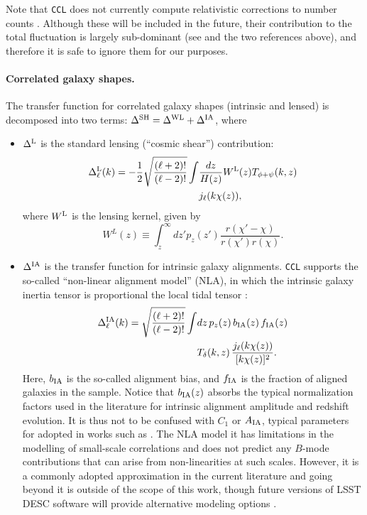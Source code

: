 \documentclass[\docopts]{\docclass}
\newcommand{\ccl}{{\tt CCL}\xspace}
\begin{document}
Note that \ccl does not currently compute relativistic corrections to number counts \citep{2011PhRvD..84d3516C,2011PhRvD..84f3505B}. Although these will be included in the future, their contribution to the total fluctuation is largely sub-dominant (see \citealt{GReffects} and the two references above), and therefore it is safe to ignore them for our purposes.

\paragraph{\bf Correlated galaxy shapes.} The transfer function for correlated galaxy shapes (intrinsic and lensed) is decomposed into two terms: $\Delta^{\rm SH}=\Delta^{\rm WL}+\Delta^{\rm IA}$, where
\begin{itemize}
  \item $\Delta^{\rm L}$ is the standard lensing (``cosmic shear'') contribution:
    \begin{align} \label{eq:transfer_lensing}
      \nonumber
      \Delta_\ell^{\rm L}(k)=-\frac{1}{2}\sqrt{\frac{(\ell+2)!}{(\ell-2)!}}\int &\frac{dz}{H(z)} W^{\rm L}(z)T_{\phi+\psi}(k,z)\\
      &j_\ell(k\chi(z)),
    \end{align}
    where $W^{\rm L}$ is the lensing kernel, given by
    \begin{equation}\label{eq:window_shear}
      W^L(z)\equiv\int_z^\infty dz' p_z(z')\frac{r(\chi'-\chi)}{r(\chi')r(\chi)}.
    \end{equation}
  \item $\Delta^{\rm IA}$ is the transfer function for intrinsic galaxy alignments. \ccl supports the so-called ``non-linear alignment model'' (NLA), in which the intrinsic galaxy inertia tensor is proportional the local tidal tensor \citep{Catelan01,2004PhRvD..70f3526H,2007MNRAS.381.1197H}:
    \begin{align}\nonumber
      \Delta_\ell^{\rm IA}(k)=\sqrt{\frac{(\ell+2)!}{(\ell-2)!}}\int &dz\,p_z(z)\,b_{\rm IA}(z)\,f_{\rm IA}(z)\\
      &T_\delta(k,z)\,\frac{j_\ell(k\chi(z))}{[k\chi(z)]^2}.
      \label{eq:transfer_ia}
    \end{align}
    Here, $b_{\rm IA}$ is the so-called alignment bias, and $f_{\rm IA}$ is the fraction of aligned galaxies in the sample. Notice that $b_{\rm IA}(z)$ absorbs the typical normalization factors used in the literature for intrinsic alignment amplitude and redshift evolution. It is thus not to be confused with $C_1$ or $A_{\rm IA}$, typical parameters for adopted in works such as \citet{vanUitert18,Joudaki18,Hildebrandt17}. The NLA model  it has limitations in the modelling of small-scale correlations \citep{Singh15} and does not predict any $B$-mode contributions that can arise from non-linearities at such scales. However, it is a commonly adopted approximation in the current literature and going beyond it is outside of the scope of this work, though future versions of LSST DESC software will provide alternative modeling options \citep{Blazek17}.
    
\end{itemize}
\end{document}
